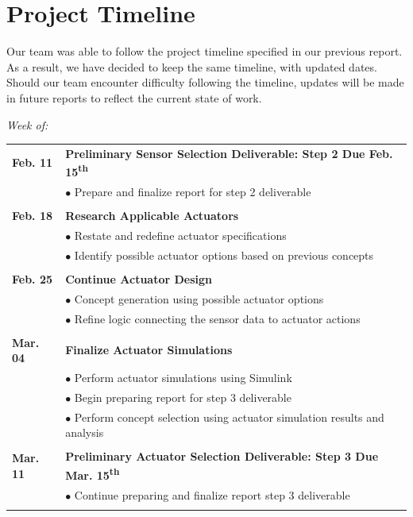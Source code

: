 \documentclass[12pt]{article}
\newcommand{\ts}{\textsuperscript}
\begin{document}
\section{Project Timeline}
Our team was able to follow the project timeline specified in our previous report. As a result, we have decided to keep the same timeline, with updated dates. Should our team encounter difficulty following the timeline, updates will be made in future reports to reflect the current state of work.\\
\begin{flushleft}
\textit{Week of:}

\begin{tabular}{l | l}


 
\textbf{Feb. 11} &\textbf{Preliminary Sensor Selection Deliverable: Step 2 Due Feb. 15\ts{th}}\\
 & $\bullet$ Prepare and finalize report for step 2 deliverable\\\\
 
\textbf{Feb. 18} &\textbf{Research Applicable Actuators}\\
 & $\bullet$ Restate and redefine actuator specifications\\
  & $\bullet$ Identify possible actuator options based on previous concepts\\\\
  
\textbf{Feb. 25} & \textbf{Continue Actuator Design}\\
 & $\bullet$ Concept generation using possible actuator options\\
  & $\bullet$ Refine logic connecting the sensor data to actuator actions\\\\
  
\textbf{Mar. 04} & \textbf{Finalize Actuator Simulations}\\
 & $\bullet$ Perform actuator simulations using Simulink\\
 & $\bullet$ Begin preparing report for step 3 deliverable\\
 & $\bullet$ Perform concept selection using actuator simulation results and analysis\\\\
 
\textbf{Mar. 11} &\textbf{Preliminary Actuator Selection Deliverable: Step 3 Due Mar. 15\ts{th}}\\
 & $\bullet$ Continue preparing and finalize report step 3 deliverable\\\\
 

\end{tabular}
\end{flushleft}
\end{document}
